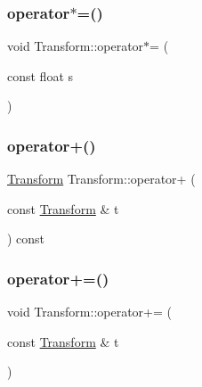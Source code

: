 \mbox{\label{class_transform_ab13378f63abf5bc132841f83423a634d}} 
\subsubsection{\texorpdfstring{operator$\ast$=()}{operator*=()}\hspace{0.1cm}{\footnotesize\ttfamily [2/2]}}
{\footnotesize\ttfamily void Transform\+::operator$\ast$= (\begin{DoxyParamCaption}\item[{const float}]{s }\end{DoxyParamCaption})}

\mbox{\label{class_transform_a8e21c258146adde8ca798878bab9ce9d}} 
\subsubsection{\texorpdfstring{operator+()}{operator+()}}
{\footnotesize\ttfamily \mbox{\hyperlink{class_transform}{Transform}} Transform\+::operator+ (\begin{DoxyParamCaption}\item[{const \mbox{\hyperlink{class_transform}{Transform}} \&}]{t }\end{DoxyParamCaption}) const}

\mbox{\label{class_transform_a3b0aa54a1ca373ec3a7052977b5bf826}} 
\subsubsection{\texorpdfstring{operator+=()}{operator+=()}}
{\footnotesize\ttfamily void Transform\+::operator+= (\begin{DoxyParamCaption}\item[{const \mbox{\hyperlink{class_transform}{Transform}} \&}]{t }\end{DoxyParamCaption})}

\mbox{\label{class_transform_a17493155309aa1650de99ce384f096a6}} 
